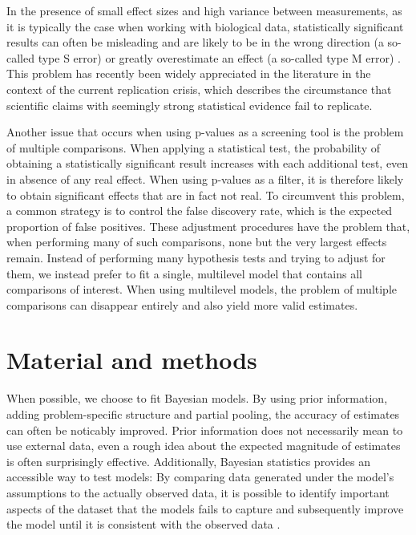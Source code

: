 \documentclass[fleqn,11pt]{SelfArx} %
\begin{document}
In the presence of small effect sizes and high variance between measurements, as 
it is typically the case when working with biological data, statistically significant
results can often be misleading and are likely to be in the wrong direction
(a so-called type S error) or greatly overestimate an effect (a so-called type M error)
\nolinebreak\cite{Gelman2014}.
This problem has recently been widely appreciated in the literature in the context
of the current \glqq replication crisis\grqq{}, which describes the circumstance that
scientific claims with seemingly strong statistical evidence fail to replicate\nolinebreak\cite{Ioannidis2005}.

Another issue that occurs when using p-values as a screening tool is the problem
of multiple comparisons. When applying a statistical test, the probability  of 
obtaining a statistically significant result increases with
each additional test, even in absence of any real effect. When using p-values as a filter,
it is therefore likely to obtain significant effects that are in fact not real.
To circumvent this problem, a common strategy is to control the false discovery
rate, which is the expected proportion of false positives\nolinebreak\cite{Benjamini1995}.
These adjustment procedures have the problem that, when performing many of such comparisons,
none but the very largest effects remain.
Instead of performing many hypothesis tests and trying to adjust for them, we instead prefer
to fit a single, multilevel model that contains all comparisons of interest.
When using multilevel models, the problem of multiple comparisons can disappear entirely and 
also yield more valid estimates\nolinebreak\cite{Gelman2012}.


\section{Material and methods}

When possible, we choose to fit Bayesian models. By using prior information,
adding problem-specific structure and partial pooling, the accuracy of estimates
can often be noticably improved\nolinebreak\cite{Gelman2010}. Prior information does not necessarily mean to
use external data, even a rough idea about the expected magnitude of estimates is often
surprisingly effective.
Additionally, Bayesian statistics provides an accessible way to test models:
By comparing data generated under the model's assumptions to the actually observed data,
it is possible to identify important aspects of the dataset that the models fails to
capture and subsequently improve the model until it is consistent with the observed data
\nolinebreak\cite{Gabry2019}.
\end{document}
